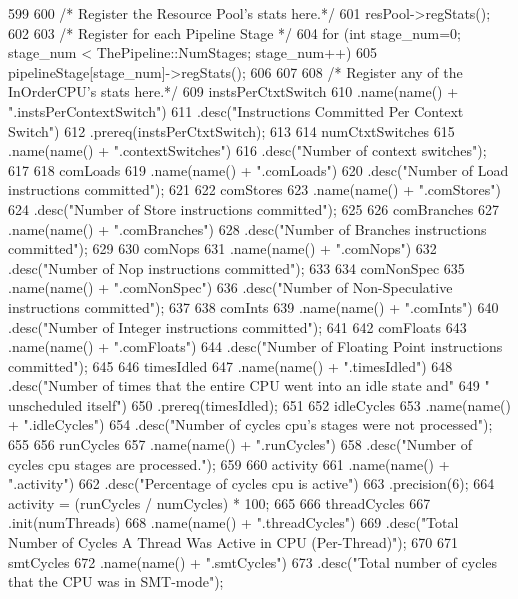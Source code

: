 \begin{DoxyCode}
599 {
600     /* Register the Resource Pool's stats here.*/
601     resPool->regStats();
602 
603     /* Register for each Pipeline Stage */
604     for (int stage_num=0; stage_num < ThePipeline::NumStages; stage_num++) {
605         pipelineStage[stage_num]->regStats();
606     }
607 
608     /* Register any of the InOrderCPU's stats here.*/
609     instsPerCtxtSwitch
610         .name(name() + ".instsPerContextSwitch")
611         .desc("Instructions Committed Per Context Switch")
612         .prereq(instsPerCtxtSwitch);
613     
614     numCtxtSwitches
615         .name(name() + ".contextSwitches")
616         .desc("Number of context switches");
617 
618     comLoads
619         .name(name() + ".comLoads")
620         .desc("Number of Load instructions committed");
621 
622     comStores
623         .name(name() + ".comStores")
624         .desc("Number of Store instructions committed");
625 
626     comBranches
627         .name(name() + ".comBranches")
628         .desc("Number of Branches instructions committed");
629 
630     comNops
631         .name(name() + ".comNops")
632         .desc("Number of Nop instructions committed");
633 
634     comNonSpec
635         .name(name() + ".comNonSpec")
636         .desc("Number of Non-Speculative instructions committed");
637 
638     comInts
639         .name(name() + ".comInts")
640         .desc("Number of Integer instructions committed");
641 
642     comFloats
643         .name(name() + ".comFloats")
644         .desc("Number of Floating Point instructions committed");
645             
646     timesIdled
647         .name(name() + ".timesIdled")
648         .desc("Number of times that the entire CPU went into an idle state and"
649               " unscheduled itself")
650         .prereq(timesIdled);
651 
652     idleCycles
653         .name(name() + ".idleCycles")
654         .desc("Number of cycles cpu's stages were not processed");
655 
656     runCycles
657         .name(name() + ".runCycles")
658         .desc("Number of cycles cpu stages are processed.");
659 
660     activity
661         .name(name() + ".activity")
662         .desc("Percentage of cycles cpu is active")
663         .precision(6);
664     activity = (runCycles / numCycles) * 100;
665 
666     threadCycles
667         .init(numThreads)
668         .name(name() + ".threadCycles")
669         .desc("Total Number of Cycles A Thread Was Active in CPU (Per-Thread)");
670 
671     smtCycles
672         .name(name() + ".smtCycles")
673         .desc("Total number of cycles that the CPU was in SMT-mode");
}
\end{DoxyCode}
